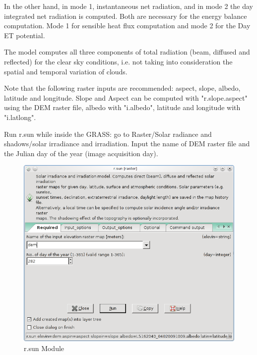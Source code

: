 In the other hand, in mode 1, instantaneous net radiation, and in mode 2 the day integrated net radiation is computed. Both are necessary for the energy balance computation. Mode 1 for sensible heat flux computation and mode 2 for the Day ET potential.\newline

The model computes all three components of total radiation (beam, diffused and reflected) for the clear sky conditions, i.e. not taking into consideration the spatial and temporal variation of clouds. \newline

Note that the following raster inputs are recommended: aspect, slope, albedo, latitude and longitude. Slope and Aspect can be computed with "r.slope.aspect" using the DEM raster file, albedo with "i.albedo", latitude and longitude with "i.latlong".\newline

Run r.sun while inside the GRASS: go to Raster/Solar radiance and shadows/solar irradiance and irradiation. Input the name of DEM raster file and the Julian day of the year (image acquisition day). \newline

\begin{figure}[htbp]
   \centering
   \includegraphics[scale=0.4]{gipe022.png}
   \caption{r.sun Module}
   \label{fig:gipe022}
\end{figure}

